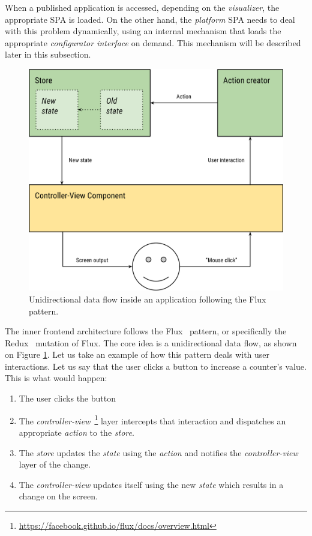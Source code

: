 When a published application is accessed, depending on the \emph{visualizer}, the appropriate SPA is loaded. On the other hand, the \emph{platform} SPA needs to deal with this problem dynamically, using an internal mechanism that loads the appropriate \emph{configurator interface} on demand. This mechanism will be described later in this subsection.
\begin{figure}
	\centering
	\includegraphics[width=120mm]{img/04_frontend_flux_redux.png}
	\caption{Unidirectional data flow inside an application following the Flux~\cite{flux} pattern.} 
	\label{fig:frontend-flux-redux}
\end{figure}

The inner frontend architecture follows the Flux~\cite{flux} pattern, or specifically the Redux~\cite{redux} mutation of Flux. The core idea is a unidirectional data flow, as shown on Figure \ref{fig:frontend-flux-redux}. Let us take an example of how this pattern deals with user interactions. Let us say that the user clicks a button to increase a counter's value. This is what would happen:

\begin{enumerate}
\item The user clicks the button
\item The \emph{controller-view}~\footnote{\url{https://facebook.github.io/flux/docs/overview.html}} layer intercepts that interaction and dispatches an appropriate \emph{action} to the \emph{store}.
\item The \emph{store} updates the \emph{state} using the \emph{action} and notifies the \emph{controller-view} layer of the change.
\item The \emph{controller-view} updates itself using the new \emph{state} which results in a change on the screen.
\end{enumerate}

